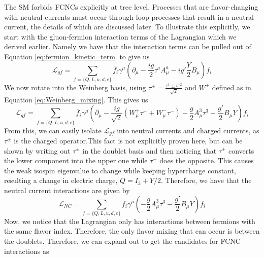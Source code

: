 The SM forbids FCNCs explicitly at tree level. Processes that are flavor-changing with neutral currents must occur through loop processes that result in a neutral current, the details of which are discussed later. To illustrate this explicitly, we start with the gluon-fermion interaction terms of the Lagrangian which we derived earlier. Namely we have that the interaction terms can be pulled out of Equation \ref{eq:fermion_kinetic_term} to give us
\begin{equation}
\mathcal{L}_{gf} = \sum_{f=\{ Q, L, u, d, e\}} \bar{f}_{i} \gamma^\mu \left(\partial_\mu - \frac{ig}{2} \tau^a A^a_\mu - ig' \frac{Y}{2} B_\mu\right)f_{i}
\end{equation}
We now rotate into the Weinberg basis, using $\tau^\pm = \frac{\tau^1 \pm i\tau^2}{\sqrt{2}}$ and $W^\pm$ defined as in Equation \ref{eq:Weinberg_mixing}. This gives us
\begin{equation}
\mathcal{L}_{gf} = \sum_{f=\{ Q, L, u, d, e\}} \bar{f}_{i} \gamma^\mu \left(\partial_\mu - \frac{ig}{\sqrt{2}} (W^+_\mu\tau^+ + W_\mu^- \tau^-) -\frac{g}{2} A^3_\mu\tau^3 - \frac{g'}{2}B_\mu Y\right)f_{i}
\end{equation}
From this, we can easily isolate $\mathcal{L}_{gf}$ into neutral currents and charged currents, as $\tau^\pm$ is the charged operator.This fact is not explicitly proven here, but can be shown by writing out $\tau^\pm$ in the doublet basis and then noticing that $\tau^+$ converts the lower component into the upper one while $\tau^-$ does the opposite. This causes the weak isospin eigenvalue to change while keeping hypercharge constant, resulting a change in electric charge, $Q = I_3 + Y/2$. Therefore, we have that the neutral current interactions are given by
\begin{equation}
\mathcal{L}_{NC} = \sum_{f=\{ Q, L, u, d, e\}} \bar{f}_{i} \gamma^\mu \left( -\frac{g}{2} A^3_\mu\tau^3 - \frac{g'}{2}B_\mu Y\right)f_{i}
\end{equation}
Now, we notice that the Lagrangian only has interactions between fermions with the same flavor index. Therefore, the only flavor mixing that can occur is between the doublets. Therefore, we can expand out to get the candidates for FCNC interactions as

